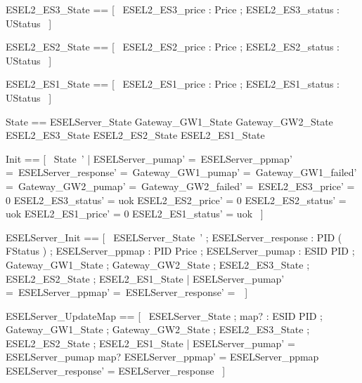 \documentclass{article}
\begin{document}
\begin{zed}
	ESEL2\_ES3\_State == [~  ESEL2\_ES3\_price : Price ; ESEL2\_ES3\_status : UStatus  ~]
\end{zed}

\begin{zed}
	ESEL2\_ES2\_State == [~  ESEL2\_ES2\_price : Price ; ESEL2\_ES2\_status : UStatus  ~]
\end{zed}

\begin{zed}
	ESEL2\_ES1\_State == [~  ESEL2\_ES1\_price : Price ; ESEL2\_ES1\_status : UStatus  ~]
\end{zed}

\begin{zed}
	State == ESELServer\_State \land Gateway\_GW1\_State \land Gateway\_GW2\_State \land ESEL2\_ES3\_State \land ESEL2\_ES2\_State \land ESEL2\_ES1\_State
\end{zed}

\begin{zed}
	Init == [~  State~' | ESELServer\_pumap' =~\emptyset \land ESELServer\_ppmap' =~\emptyset \land ESELServer\_response' =~\emptyset \land Gateway\_GW1\_pumap' =~\emptyset \land Gateway\_GW1\_failed' =~\emptyset \land Gateway\_GW2\_pumap' =~\emptyset \land Gateway\_GW2\_failed' =~\emptyset \land ESEL2\_ES3\_price' = 0 \land ESEL2\_ES3\_status' = uok \land ESEL2\_ES2\_price' = 0 \land ESEL2\_ES2\_status' = uok \land ESEL2\_ES1\_price' = 0 \land ESEL2\_ES1\_status' = uok  ~]
\end{zed}

\begin{zed}
	ESELServer\_Init == [~  ESELServer\_State~' ; ESELServer\_response : PID \pfun ( \power FStatus ) ; ESELServer\_ppmap : PID \pfun Price ; ESELServer\_pumap : ESID \pfun PID ; \Xi Gateway\_GW1\_State ; \Xi Gateway\_GW2\_State ; \Xi ESEL2\_ES3\_State ; \Xi ESEL2\_ES2\_State ; \Xi ESEL2\_ES1\_State | ESELServer\_pumap' =~\emptyset \land ESELServer\_ppmap' =~\emptyset \land ESELServer\_response' =~\emptyset  ~]
\end{zed}

\begin{zed}
	ESELServer\_UpdateMap == [~  \Delta ESELServer\_State ; map? : ESID \pfun PID ; \Xi Gateway\_GW1\_State ; \Xi Gateway\_GW2\_State ; \Xi ESEL2\_ES3\_State ; \Xi ESEL2\_ES2\_State ; \Xi ESEL2\_ES1\_State | ESELServer\_pumap' = ESELServer\_pumap \oplus map? \land ESELServer\_ppmap' = ESELServer\_ppmap \land ESELServer\_response' = ESELServer\_response  ~]
\end{zed}
\end{document}
